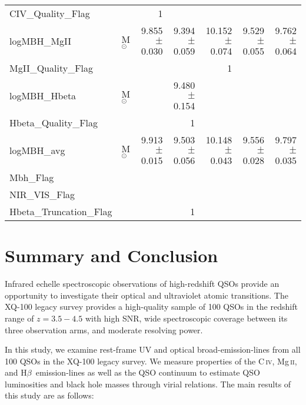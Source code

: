 \documentclass[fleqn,usenatbib]{mnras}
\newcommand{\mgii}{Mg\,\textsc{ii}}
\newcommand{\civ}{C\,\textsc{iv}}
\newcommand{\hbeta}{H\textsc{$\beta$}}
\begin{document}
\begin{table*}
\begin{tabular}{llrrrrr}
CIV\_Quality\_Flag &  & 1 &  &  &  &  \\ 
logMBH\_MgII & M$_{\odot}$ & 9.855 $\pm$ 0.030 & 9.394 $\pm$ 0.059 & 10.152 $\pm$ 0.074 & 9.529 $\pm$ 0.055 & 9.762 $\pm$ 0.064 \\ 
MgII\_Quality\_Flag &  &  &  & 1 &  &  \\ 
logMBH\_Hbeta & M$_{\odot}$ &  & 9.480 $\pm$ 0.154 &  &  &  \\ 
Hbeta\_Quality\_Flag &  &  & 1 &  &  &  \\ 
logMBH\_avg & M$_{\odot}$ & 9.913 $\pm$ 0.015 & 9.503 $\pm$ 0.056 & 10.148 $\pm$ 0.043 & 9.556 $\pm$ 0.028 & 9.797 $\pm$ 0.035 \\ 
Mbh\_Flag &  &  &  &  &  &  \\ 
NIR\_VIS\_Flag &  &  &  &  &  &  \\ 
Hbeta\_Truncation\_Flag &  &  & 1 &  &  &  \\ 
\hline \hline
\end{tabular}
\end{table*}
\endgroup





\section{Summary and Conclusion} \label{sec:conclusion}
Infrared echelle spectroscopic observations of high-redshift QSOs provide an opportunity to investigate their optical and ultraviolet atomic transitions. The XQ-100 legacy survey provides a high-quality sample of 100 QSOs in the redshift range of $z=3.5-4.5$ with high SNR, wide spectroscopic coverage between its three observation arms, and moderate resolving power.

In this study, we examine rest-frame UV and optical broad-emission-lines from all 100 QSOs in the XQ-100 legacy survey. We measure properties of the 
\civ, \mgii, and \hbeta\ emission-lines as well as the QSO continuum to estimate QSO luminosities and black hole masses through virial relations. The main results of this study are as follows:
\end{document}

